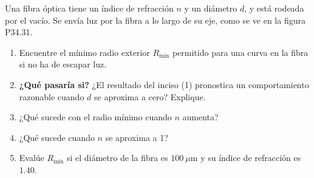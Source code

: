 \item Una fibra óptica tiene un índice de refracción $n$ y un diámetro $d$, y está rodeada por el vacío. Se envía luz por la fibra a lo largo de su eje, como se ve en la figura P34.31.
\begin{enumerate}
    \item Encuentre el mínimo radio exterior $R_{\text{mín}}$ permitido para una curva en la fibra si no ha de escapar luz.
    \item \textbf{¿Qué pasaría si?} ¿El resultado del inciso (1) pronostica un comportamiento razonable cuando $d$ se aproxima a cero? Explique.
    \item ¿Qué sucede con el radio mínimo cuando $n$ aumenta?
    \item ¿Qué sucede cuando $n$ se aproxima a 1?
    \item Evalúe $R_{\text{mín}}$ si el diámetro de la fibra es $100\ \mu\text{m}$ y su índice de refracción es $1.40$.
\end{enumerate}